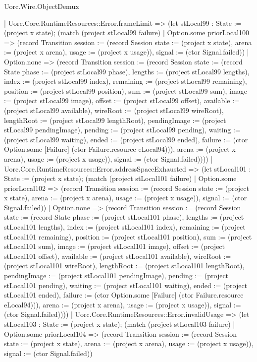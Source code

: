 \begin{lexlean}{Uorc.Wire.ObjectDemux}
\begin{semanticmodule}
{      | Uorc.Core.RuntimeResources::Error.frameLimit => (let stLocal99 : State := (project x state); (match (project stLocal99 failure)
        | Option.some priorLocal100 => (record Transition {session := (record Session {state := (project x state), arena := (project x arena), usage := (project x usage)}), signal := (ctor Signal.failed)})
        | Option.none => (record Transition {session := (record Session {state := (record State {phase := (project stLocal99 phase), lengths := (project stLocal99 lengths), index := (project stLocal99 index), remaining := (project stLocal99 remaining), position := (project stLocal99 position), sum := (project stLocal99 sum), image := (project stLocal99 image), offset := (project stLocal99 offset), available := (project stLocal99 available), wireRoot := (project stLocal99 wireRoot), lengthRoot := (project stLocal99 lengthRoot), pendingImage := (project stLocal99 pendingImage), pending := (project stLocal99 pending), waiting := (project stLocal99 waiting), ended := (project stLocal99 ended), failure := (ctor Option.some [Failure] (ctor Failure.resource eLocal94))}), arena := (project x arena), usage := (project x usage)}), signal := (ctor Signal.failed)})))
      | Uorc.Core.RuntimeResources::Error.addressSpaceExhausted => (let stLocal101 : State := (project x state); (match (project stLocal101 failure)
        | Option.some priorLocal102 => (record Transition {session := (record Session {state := (project x state), arena := (project x arena), usage := (project x usage)}), signal := (ctor Signal.failed)})
        | Option.none => (record Transition {session := (record Session {state := (record State {phase := (project stLocal101 phase), lengths := (project stLocal101 lengths), index := (project stLocal101 index), remaining := (project stLocal101 remaining), position := (project stLocal101 position), sum := (project stLocal101 sum), image := (project stLocal101 image), offset := (project stLocal101 offset), available := (project stLocal101 available), wireRoot := (project stLocal101 wireRoot), lengthRoot := (project stLocal101 lengthRoot), pendingImage := (project stLocal101 pendingImage), pending := (project stLocal101 pending), waiting := (project stLocal101 waiting), ended := (project stLocal101 ended), failure := (ctor Option.some [Failure] (ctor Failure.resource eLocal94))}), arena := (project x arena), usage := (project x usage)}), signal := (ctor Signal.failed)})))
      | Uorc.Core.RuntimeResources::Error.invalidUsage => (let stLocal103 : State := (project x state); (match (project stLocal103 failure)
        | Option.some priorLocal104 => (record Transition {session := (record Session {state := (project x state), arena := (project x arena), usage := (project x usage)}), signal := (ctor Signal.failed)})
}
\end{semanticmodule}
\end{lexlean}
